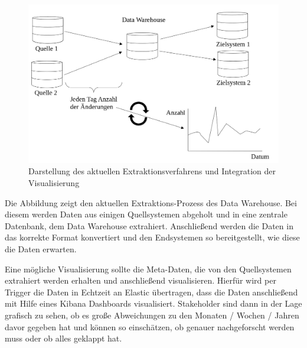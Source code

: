 \begin{figure}[h]
\centering
\includegraphics[width=150mm,scale=1]{content/Darstellung_vis_pipeline.png}
\caption{Darstellung des aktuellen Extraktionsverfahrens und Integration der Visualisierung }%
\end{figure}
Die Abbildung zeigt den aktuellen Extraktions-Prozess des Data Warehouse. 
Bei diesem werden Daten aus einigen Quellsystemen abgeholt und in eine zentrale Datenbank, dem Data Warehouse extrahiert.
Anschließend werden die Daten in das korrekte Format konvertiert und den Endsystemen so bereitgestellt, wie diese die Daten erwarten.

Eine mögliche Visualisierung sollte die Meta-Daten, die von den Quellsystemen extrahiert werden erhalten und anschließend visualisieren.
Hierfür wird per Trigger die Daten in Echtzeit an Elastic übertragen, dass die Daten anschließend mit Hilfe eines Kibana Dashboards visualisiert.
Stakeholder sind dann in der Lage grafisch zu sehen, ob es große Abweichungen zu den Monaten / Wochen / Jahren davor gegeben hat und können so einschätzen, ob genauer nachgeforscht werden muss oder ob alles geklappt hat.





















